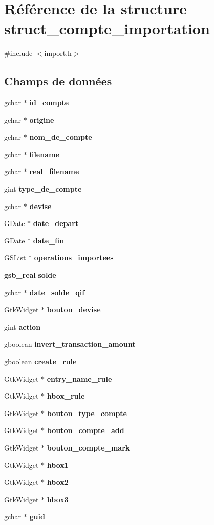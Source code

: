 \section{Référence de la structure struct\_\-compte\_\-importation}
\label{structstruct__compte__importation}


{\ttfamily \#include $<$import.h$>$}

\subsection*{Champs de données}
\begin{DoxyCompactItemize}
\item 
gchar $\ast$ {\bf id\_\-compte}
\item 
gchar $\ast$ {\bf origine}
\item 
gchar $\ast$ {\bf nom\_\-de\_\-compte}
\item 
gchar $\ast$ {\bf filename}
\item 
gchar $\ast$ {\bf real\_\-filename}
\item 
gint {\bf type\_\-de\_\-compte}
\item 
gchar $\ast$ {\bf devise}
\item 
GDate $\ast$ {\bf date\_\-depart}
\item 
GDate $\ast$ {\bf date\_\-fin}
\item 
GSList $\ast$ {\bf operations\_\-importees}
\item 
{\bf gsb\_\-real} {\bf solde}
\item 
gchar $\ast$ {\bf date\_\-solde\_\-qif}
\item 
GtkWidget $\ast$ {\bf bouton\_\-devise}
\item 
gint {\bf action}
\item 
gboolean {\bf invert\_\-transaction\_\-amount}
\item 
gboolean {\bf create\_\-rule}
\item 
GtkWidget $\ast$ {\bf entry\_\-name\_\-rule}
\item 
GtkWidget $\ast$ {\bf hbox\_\-rule}
\item 
GtkWidget $\ast$ {\bf bouton\_\-type\_\-compte}
\item 
GtkWidget $\ast$ {\bf bouton\_\-compte\_\-add}
\item 
GtkWidget $\ast$ {\bf bouton\_\-compte\_\-mark}
\item 
GtkWidget $\ast$ {\bf hbox1}
\item 
GtkWidget $\ast$ {\bf hbox2}
\item 
GtkWidget $\ast$ {\bf hbox3}
\item 
gchar $\ast$ {\bf guid}
\end{DoxyCompactItemize}


